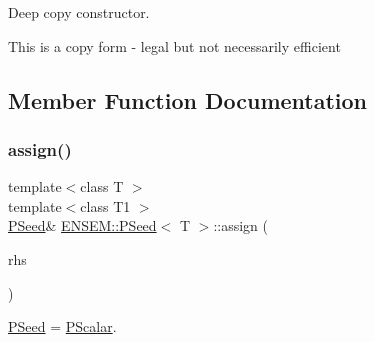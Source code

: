 Deep copy constructor. 

This is a copy form -\/ legal but not necessarily efficient 

\subsection{Member Function Documentation}
\mbox{\label{classENSEM_1_1PSeed_a8d74bd21af23dfb165937c3bb546ea8f}} 
\subsubsection{\texorpdfstring{assign()}{assign()}\hspace{0.1cm}{\footnotesize\ttfamily [1/3]}}
{\footnotesize\ttfamily template$<$class T $>$ \\
template$<$class T1 $>$ \\
\mbox{\hyperlink{classENSEM_1_1PSeed}{P\+Seed}}\& \mbox{\hyperlink{classENSEM_1_1PSeed}{E\+N\+S\+E\+M\+::\+P\+Seed}}$<$ T $>$\+::assign (\begin{DoxyParamCaption}\item[{const \mbox{\hyperlink{classENSEM_1_1PScalar}{P\+Scalar}}$<$ T1 $>$ \&}]{rhs }\end{DoxyParamCaption})\hspace{0.3cm}{\ttfamily [inline]}}



\mbox{\hyperlink{classENSEM_1_1PSeed}{P\+Seed}} = \mbox{\hyperlink{classENSEM_1_1PScalar}{P\+Scalar}}. 

